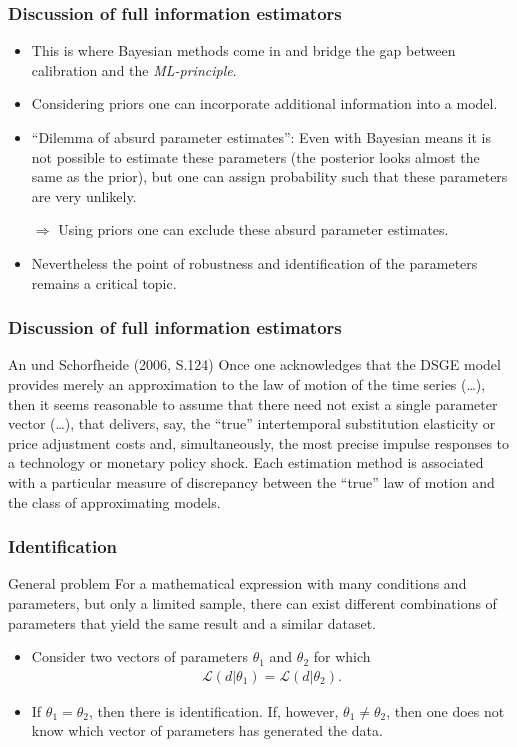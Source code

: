 \documentclass[handout]{beamer}  %
\begin{document}
\begin{frame}\frametitle{Discussion of full information estimators}
	\begin{itemize}
		\item This is where Bayesian methods come in and bridge the gap between calibration and the \emph{ML-principle}.
		\item Considering priors one can incorporate additional information into a model.
		\item \enquote{Dilemma of absurd parameter estimates}: Even with Bayesian means it is not possible to estimate these parameters (the posterior looks almost the same as the prior), but one can assign probability such that these parameters are very unlikely.
		\item[$\Rightarrow$] Using priors one can exclude these absurd parameter estimates.
		\item Nevertheless the point of robustness and identification of the parameters remains a critical topic.
	\end{itemize}
\end{frame}

\begin{frame}\frametitle{Discussion of full information estimators}
	
	\begin{block}{An und Schorfheide (2006, S.124)}
		Once one acknowledges that the DSGE model provides merely an approximation to
		the law of motion of the time series (\dots), then it seems reasonable to
		assume that there need not exist a single parameter vector (\dots), that
		delivers, say, the \enquote{true} intertemporal substitution elasticity or
		price adjustment costs and, simultaneously, the most precise impulse
		responses to a technology or monetary policy shock. Each estimation method is
		associated with a particular measure of discrepancy between the
		\enquote{true} law of motion and the class of approximating models.
	\end{block}
\end{frame}

\begin{frame}\frametitle{Identification}
	\begin{block}{General problem} For a mathematical expression with many conditions and parameters, but only a limited sample, there can exist different combinations of parameters that yield the same result and a similar dataset.\end{block}
	\begin{itemize}
		\item Consider two vectors of parameters ${\theta_1}$ and ${\theta_2}$ for which
		\begin{align*}
			\mathcal{L}({d}|{\theta_1}) = \mathcal{L}({d}|{\theta_2}).
		\end{align*}
		\item If ${\theta_1} = {\theta_2}$, then there is identification. If, however, ${\theta_1} \neq {\theta_2}$, then one does not know which vector of parameters has generated the data.
	\end{itemize}
\end{frame}
\end{document}
